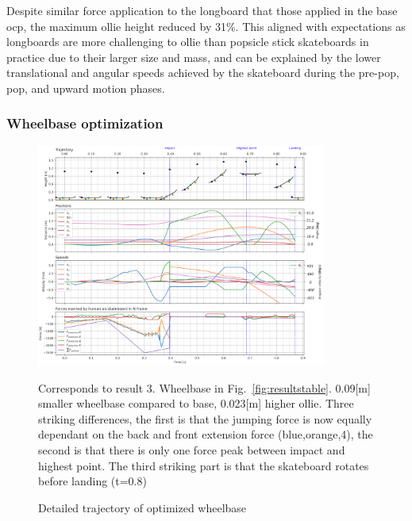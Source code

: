 \documentclass[default,iicol]{sn-jnl}
\begin{document}
Despite similar force application to the longboard that those applied in the base \gls{ocp}, the maximum ollie height reduced by 31\%. This aligned with expectations as longboards are more challenging to ollie than popsicle stick skateboards in practice due to their larger size and mass, and can be explained by the lower translational and angular speeds achieved by the skateboard during the pre-pop, pop, and upward motion phases.

\subsubsection{Wheelbase optimization}

\begin{figure}
    \centering
    \includegraphics[trim={0cm 0cm 0cm 0cm},clip,width=0.85\textwidth]{paper/figure/Results/data_l_wbdpi600 (1).png}    
    \caption[Trajectory, positions, speeds, and forces for wheelbase optimization]{Detailed trajectory of optimized wheelbase}\label{f_wheelbase}
    Corresponds to result 3. Wheelbase in Fig.~\ref{fig:resultstable}. 0.09[m] smaller wheelbase compared to base, 0.023[m] higher ollie. Three striking differences, the first is that the jumping force is now equally dependant on the back and front extension force (blue,orange,4), the second is that there is only one force peak between impact and highest point. The third striking part is that the skateboard rotates before landing (t=0.8)


\end{figure}
\end{document}

